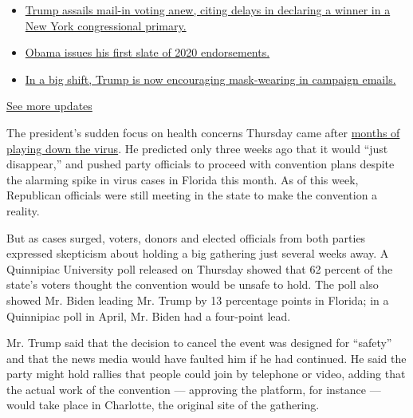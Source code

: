 \begin{itemize}
\tightlist
\item
  \href{https://www.nytimes3xbfgragh.onion/2020/08/03/us/elections/biden-vs-trump.html?action=click\&pgtype=Article\&state=default\&region=MAIN_CONTENT_1\&context=storylines_live_updates\#link-6494b448}{Trump
  assails mail-in voting anew, citing delays in declaring a winner in a
  New York congressional primary.}
\item
  \href{https://www.nytimes3xbfgragh.onion/2020/08/03/us/elections/biden-vs-trump.html?action=click\&pgtype=Article\&state=default\&region=MAIN_CONTENT_1\&context=storylines_live_updates\#link-3de249e6}{Obama
  issues his first slate of 2020 endorsements.}
\item
  \href{https://www.nytimes3xbfgragh.onion/2020/08/03/us/elections/biden-vs-trump.html?action=click\&pgtype=Article\&state=default\&region=MAIN_CONTENT_1\&context=storylines_live_updates\#link-54e34d20}{In
  a big shift, Trump is now encouraging mask-wearing in campaign
  emails.}
\end{itemize}

\href{https://www.nytimes3xbfgragh.onion/2020/08/03/us/elections/biden-vs-trump.html?action=click\&pgtype=Article\&state=default\&region=MAIN_CONTENT_1\&context=storylines_live_updates}{See
more updates}

The president's sudden focus on health concerns Thursday came after
\href{https://www.nytimes3xbfgragh.onion/2020/07/18/us/politics/trump-coronavirus-response-failure-leadership.html}{months
of playing down the virus}. He predicted only three weeks ago that it
would ``just disappear,'' and pushed party officials to proceed with
convention plans despite the alarming spike in virus cases in Florida
this month. As of this week, Republican officials were still meeting in
the state to make the convention a reality.

But as cases surged, voters, donors and elected officials from both
parties expressed skepticism about holding a big gathering just several
weeks away. A Quinnipiac University poll released on Thursday showed
that 62 percent of the state's voters thought the convention would be
unsafe to hold. The poll also showed Mr. Biden leading Mr. Trump by 13
percentage points in Florida; in a Quinnipiac poll in April, Mr. Biden
had a four-point lead.

Mr. Trump said that the decision to cancel the event was designed for
``safety'' and that the news media would have faulted him if he had
continued. He said the party might hold rallies that people could join
by telephone or video, adding that the actual work of the convention ---
approving the platform, for instance --- would take place in Charlotte,
the original site of the gathering.

